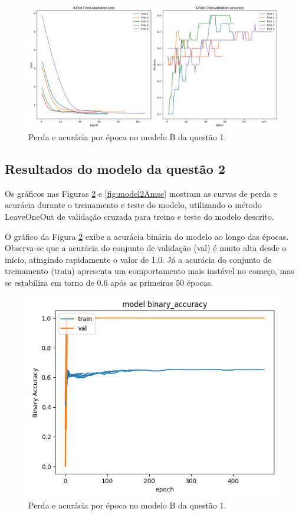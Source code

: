 \documentclass[12pt]{article}
\begin{document}
\begin{figure}[h]
    \centering
    \includegraphics[width=1\linewidth]{casoB1.png}
    \caption{Perda e acurácia por época no modelo B da questão 1.}
    \label{fig:model1BGraphs}
\end{figure}

\subsection{Resultados do modelo da questão 2}

Os gráficos nas Figuras \ref{fig:model2bacc} e \ref{fig:model2Amse} mostram as curvas de perda e acurácia durante o treinamento e teste do modelo, utilizando o método LeaveOneOut de validação cruzada para treino e teste do modelo descrito.

O gráfico da Figura \ref{fig:model2bacc} exibe a acurácia binária do modelo ao longo das épocas. Observa-se que a acurácia do conjunto de validação (val) é muito alta desde o início, atingindo rapidamente o valor de 1.0. Já a acurácia do conjunto de treinamento (train) apresenta um comportamento mais instável no começo, mas se estabiliza em torno de 0.6 após as primeiras 50 épocas.

\begin{figure}[h]
    \centering
    \includegraphics[width=0.8\linewidth]{bacc.png}
    \caption{Perda e acurácia por época no modelo B da questão 1.}
    \label{fig:model2bacc}
\end{figure}
\end{document}
